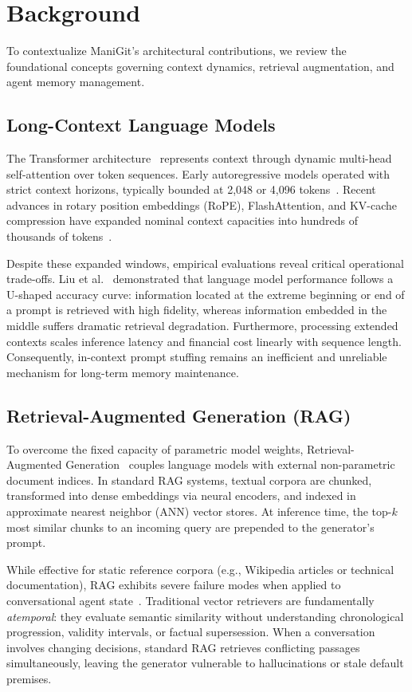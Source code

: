 \section{Background}
\label{sec:background}

To contextualize ManiGit's architectural contributions, we review the foundational concepts governing context dynamics, retrieval augmentation, and agent memory management.

\subsection{Long-Context Language Models}
The Transformer architecture~\cite{vaswani2017attention} represents context through dynamic multi-head self-attention over token sequences. Early autoregressive models operated with strict context horizons, typically bounded at 2,048 or 4,096 tokens~\cite{brown2020language}. Recent advances in rotary position embeddings (RoPE), FlashAttention, and KV-cache compression have expanded nominal context capacities into hundreds of thousands of tokens~\cite{dong2023bamboo}.

Despite these expanded windows, empirical evaluations reveal critical operational trade-offs. Liu et al.~\cite{liu2024lost} demonstrated that language model performance follows a U-shaped accuracy curve: information located at the extreme beginning or end of a prompt is retrieved with high fidelity, whereas information embedded in the middle suffers dramatic retrieval degradation. Furthermore, processing extended contexts scales inference latency and financial cost linearly with sequence length. Consequently, in-context prompt stuffing remains an inefficient and unreliable mechanism for long-term memory maintenance.

\subsection{Retrieval-Augmented Generation (RAG)}
To overcome the fixed capacity of parametric model weights, Retrieval-Augmented Generation~\cite{lewis2020retrieval,guu2020realm} couples language models with external non-parametric document indices. In standard RAG systems, textual corpora are chunked, transformed into dense embeddings via neural encoders, and indexed in approximate nearest neighbor (ANN) vector stores. At inference time, the top-$k$ most similar chunks to an incoming query are prepended to the generator's prompt.

While effective for static reference corpora (e.g., Wikipedia articles or technical documentation), RAG exhibits severe failure modes when applied to conversational agent state~\cite{stale2025benchmark}. Traditional vector retrievers are fundamentally \textit{atemporal}: they evaluate semantic similarity without understanding chronological progression, validity intervals, or factual supersession. When a conversation involves changing decisions, standard RAG retrieves conflicting passages simultaneously, leaving the generator vulnerable to hallucinations or stale default premises.

